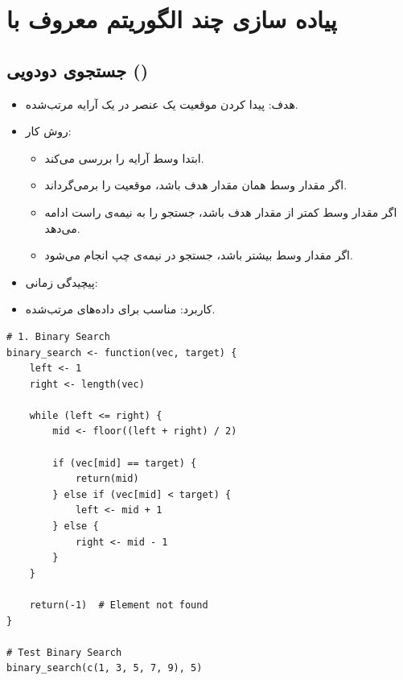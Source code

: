 \documentclass[11pt, a4paper, oneside]{book}
\begin{document}
	\chapter{پیاده سازی چند الگوریتم معروف با }
	
		\section{جستجوی دودویی ()}
		
		
			\begin{itemize}
				
				\item {\large هدف}:
				پیدا کردن موقعیت یک عنصر در یک آرایه مرتب‌شده.
				
				\item {\large روش کار}: \par
				
				\begin{itemize}
					
					\item ابتدا وسط آرایه را بررسی می‌کند.
					
					\item اگر مقدار وسط همان مقدار هدف باشد، موقعیت را برمی‌گرداند.
					
					\item اگر مقدار وسط کمتر از مقدار هدف باشد، جستجو را به نیمه‌ی راست ادامه می‌دهد.
					
					\item اگر مقدار وسط بیشتر باشد، جستجو در نیمه‌ی چپ انجام می‌شود.
					
				\end{itemize}
				
				\item {\large پیچیدگی زمانی}:
				
				\item {\large کاربرد}:
				مناسب برای داده‌های مرتب‌شده.
			\end{itemize}
			
			\begin{latin}
				\begin{lstlisting}[caption={\lr{Binary Search}}] 
# 1. Binary Search
binary_search <- function(vec, target) {
	left <- 1
	right <- length(vec)
	
	while (left <= right) {
		mid <- floor((left + right) / 2)
		
		if (vec[mid] == target) {
			return(mid)
		} else if (vec[mid] < target) {
			left <- mid + 1
		} else {
			right <- mid - 1
		}
	}
	
	return(-1)  # Element not found
}

# Test Binary Search
binary_search(c(1, 3, 5, 7, 9), 5)

				\end{lstlisting}
			\end{latin}
			
\end{document}
